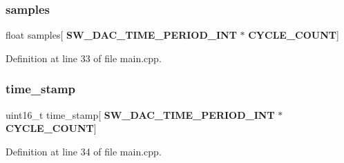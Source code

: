 \subsubsection{samples}
{\footnotesize\ttfamily float samples[\textbf{ S\+W\+\_\+\+D\+A\+C\+\_\+\+T\+I\+M\+E\+\_\+\+P\+E\+R\+I\+O\+D\+\_\+\+I\+NT} $\ast$\textbf{ C\+Y\+C\+L\+E\+\_\+\+C\+O\+U\+NT}]}



Definition at line 33 of file main.\+cpp.

\mbox{\label{main_8cpp_a820dc6e7dfee5d8f43c195ebbca6198b}} 
\subsubsection{time\_stamp}
{\footnotesize\ttfamily uint16\+\_\+t time\+\_\+stamp[\textbf{ S\+W\+\_\+\+D\+A\+C\+\_\+\+T\+I\+M\+E\+\_\+\+P\+E\+R\+I\+O\+D\+\_\+\+I\+NT} $\ast$\textbf{ C\+Y\+C\+L\+E\+\_\+\+C\+O\+U\+NT}]}



Definition at line 34 of file main.\+cpp.

